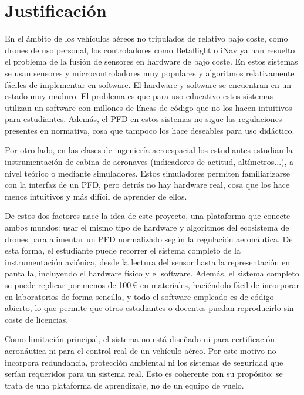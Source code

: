 \chapter{Justificación}

En el ámbito de los vehículos aéreos no tripulados de relativo bajo coste, como drones de uso personal, los controladores como Betaflight o iNav ya han resuelto el problema de la fusión de sensores en hardware de bajo coste. En estos sistemas se usan sensores y  microcontroladores muy populares y algoritmos relativamente fáciles de implementar en software. El hardware y software se encuentran en un estado muy maduro. El problema es que para uso educativo estos sistemas utilizan un software con millones de líneas de código que no los hacen intuitivos para estudiantes. Además, el PFD en estos sistemas no sigue las regulaciones presentes en normativa, cosa que tampoco los hace deseables para uso didáctico. \newline

Por otro lado, en las clases de ingeniería aeroespacial los estudiantes estudian la instrumentación de cabina de aeronaves (indicadores de actitud, altímetros...), a nivel teórico o mediante simuladores. Estos simuladores permiten familiarizarse con la interfaz de un PFD, pero detrás no hay hardware real, cosa que los hace menos intuitivos y más difícil de aprender de ellos. \newline

De estos dos factores nace la idea de este proyecto, una plataforma que conecte ambos mundos: usar el mismo tipo de hardware y algoritmos del ecosistema de drones para alimentar un PFD normalizado según la regulación aeronáutica. De esta forma, el estudiante puede recorrer el sistema completo de la instrumentación aviónica, desde la lectura del sensor hasta la representación en pantalla, incluyendo el hardware físico y el software. Además, el sistema completo se puede replicar por menos de 100\,€ en materiales, haciéndolo fácil de incorporar en laboratorios de forma sencilla, y todo el software empleado es de código abierto, lo que permite que otros estudiantes o docentes puedan reproducirlo sin coste de licencias. \newline

Como limitación principal, el sistema no está diseñado ni para certificación aeronáutica ni para el control real de un vehículo aéreo. Por este motivo no incorpora redundancia, protección ambiental ni los sistemas de seguridad que serían requeridos para un sistema real. Esto es coherente con su propósito: se trata de una plataforma de aprendizaje, no de un equipo de vuelo.